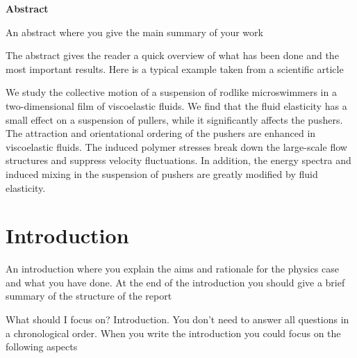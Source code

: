 \documentclass{article}
\begin{document}
\vspace{1cm}


\begin{center}

{\Large\textbf{Abstract}} \label{sec:Abstract}

\end{center}

An abstract where you give the main summary of your work


The abstract gives the reader a quick overview of what has been done and the most important results. Here is a typical example taken from a scientific article

We study the collective motion of a suspension of rodlike microswimmers in a two-dimensional film of viscoelastic fluids. We find that the fluid elasticity has a small effect on a suspension of pullers, while it significantly affects the pushers. The attraction and orientational ordering of the pushers are enhanced in viscoelastic fluids. The induced polymer stresses break down the large-scale flow structures and suppress velocity fluctuations. In addition, the energy spectra and induced mixing in the suspension of pushers are greatly modified by fluid elasticity.

\newpage


\vspace{1cm}

\tableofcontents

\vspace{1cm}

\vspace{1cm}

\section{Introduction} \label{sec:Introduction}

An introduction where you explain the aims and rationale for the physics case and what you have done. At the end of the introduction you should give a brief summary of the structure of the report


What should I focus on? Introduction.
You don't need to answer all questions in a chronological order. When you write the introduction you could focus on the following aspects
\end{document}
